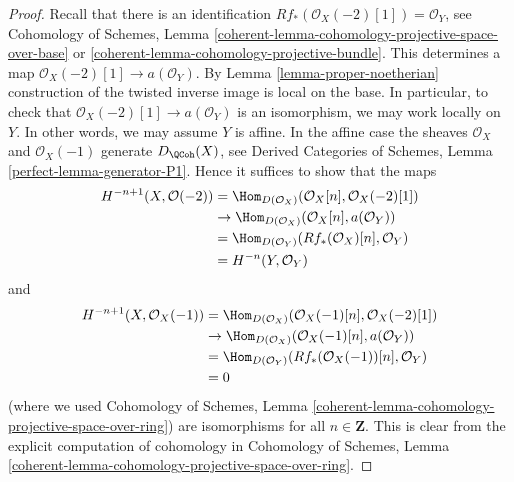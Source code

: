 \begin{proof}
Recall that there is an identification
$Rf_*(\mathcal{O}_X(-2)[1]) = \mathcal{O}_Y$, see
Cohomology of Schemes, Lemma
\ref{coherent-lemma-cohomology-projective-space-over-base} or
\ref{coherent-lemma-cohomology-projective-bundle}.
This determines a map $\mathcal{O}_X(-2)[1] \to a(\mathcal{O}_Y)$.
By Lemma \ref{lemma-proper-noetherian} construction of the twisted
inverse image is local on the base. In particular, to check that
$\mathcal{O}_X(-2)[1] \to a(\mathcal{O}_Y)$ is an isomorphism, we
may work locally on $Y$. In other words, we may assume $Y$ is affine.
In the affine case the sheaves $\mathcal{O}_X$ and $\mathcal{O}_X(-1)$
generate $D_\QCoh(X)$, see
Derived Categories of Schemes, Lemma \ref{perfect-lemma-generator-P1}.
Hence it suffices to show that the maps
\begin{align*}
H^{-n + 1}(X, \mathcal{O}(-2))
& = 
\Hom_{D(\mathcal{O}_X)}(\mathcal{O}_X[n], \mathcal{O}_X(-2)[1]) \\
& \to
\Hom_{D(\mathcal{O}_X)}(\mathcal{O}_X[n], a(\mathcal{O}_Y)) \\
& =
\Hom_{D(\mathcal{O}_Y)}(Rf_*(\mathcal{O}_X)[n], \mathcal{O}_Y) \\
& =
H^{-n}(Y, \mathcal{O}_Y)
\end{align*}
and
\begin{align*}
H^{-n + 1}(X, \mathcal{O}_X(-1))
& = 
\Hom_{D(\mathcal{O}_X)}(\mathcal{O}_X(-1)[n], \mathcal{O}_X(-2)[1]) \\
& \to
\Hom_{D(\mathcal{O}_X)}(\mathcal{O}_X(-1)[n], a(\mathcal{O}_Y)) \\
& =
\Hom_{D(\mathcal{O}_Y)}(Rf_*(\mathcal{O}_X(-1))[n], \mathcal{O}_Y) \\
& = 0
\end{align*}
(where we used Cohomology of Schemes, Lemma
\ref{coherent-lemma-cohomology-projective-space-over-ring})
are isomorphisms for all $n \in \mathbf{Z}$. This is clear from
the explicit computation of cohomology in
Cohomology of Schemes, Lemma
\ref{coherent-lemma-cohomology-projective-space-over-ring}.
\end{proof}


